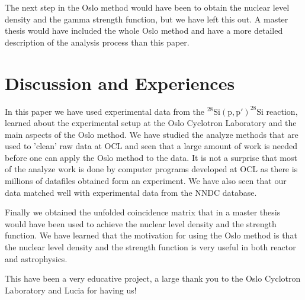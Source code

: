 \documentclass[11pt,a4wide]{article}
\begin{document}
The next step in the Oslo method would have been to obtain the nuclear level density and the gamma strength function, but we have left this out. A master thesis would have included the whole Oslo method and have a more detailed description of the analysis process than this paper. 



\section{Discussion and Experiences}
In this paper we have used experimental data from the ${}^{28}\mathrm{Si(p,p')}^{28}\mathrm{Si}$ reaction, learned about the experimental setup at the Oslo Cyclotron Laboratory and the main aspects of the Oslo method. We have studied the analyze methods that are used to 'clean' raw data at OCL and seen that a large amount of work is needed before one can apply the Oslo method to the data. It is not a surprise that most of the analyze work is done by computer programs developed at OCL as there is millions of datafiles obtained form an experiment. We have also seen that our data matched well with experimental data from the NNDC database.

Finally we obtained the unfolded coincidence matrix that in a master thesis would have been used to achieve the nuclear level density and the strength function. We have learned that the motivation for using the Oslo method is that the nuclear level density and the strength function is very useful in both reactor and astrophysics. 

This have been a very educative project, a large thank you to the Oslo Cyclotron Laboratory and Lucia for having us! 


\end{document}
